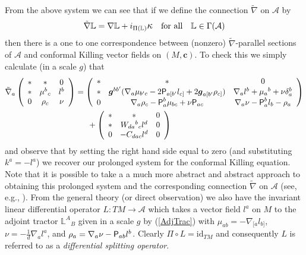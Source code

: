 \documentclass[a4paper,12pt]{amsart}
\newcommand{\kappal}{\mbox{\large{$\kappa$}}}
\newcommand{\V}{\mbox{\sf P}}
\newcommand{\cc}{\boldsymbol{c}}
\def\bg{\mbox{\boldmath $g$}}
\theoremstyle{remark}
\newcommand{\nn}[1]{(\ref{#1})}
\begin{document}
From the above system we can see that if we define the connection $\tilde{\nabla}$ on $\mathcal{A}$ by
\begin{equation}
\tilde{\nabla}\mathbb{L} = \nabla \mathbb{L} + i_{\Pi (\mathbb{L})}\kappal \quad \mbox{for all} \quad \mathbb{L}\in \Gamma(\mathcal{A})
\end{equation}
then there is a one to one correspondence between (nonzero) $\tilde{\nabla}$-parallel sections of $\mathcal{A}$ and conformal Killing vector fields on $(M,\cc)$. To check this we simply calculate (in a scale $g$) that
\begin{align*}
\tilde{\nabla}_a 
\left(\begin{array}{ccc} * & * & 0 \\
* & \mu^b{_c} & l^b \\ 
0 & \rho_c & \nu \\
\end{array}\right)
 &=
\left(\begin{array}{ccc} * & * & 0 \\
* & \bg^{bb'}(\nabla_a\mu_{b'c} - 2\V_{a[b'}l_{c]} + 2\bg_{a[b'}\rho_{c]}) & \nabla_a l^b + \mu_a{^b} + \nu \delta_a^b \\ 
0 & \nabla_a\rho_c - \V_a^b\mu_{bc} +\nu \V_{ac} & \nabla_a\nu -\V_a^b l_b -\rho_a\\
\end{array}\right) \\
& \quad \; \; +
\left(\begin{array}{ccc} * & * & 0 \\
* & W_{da}{^b}_c l^d & 0 \\ 
0 & -C_{dac}l^d & 0 \\
\end{array}\right)
\end{align*}
and observe that by setting the right hand side equal to zero (and substituting $k^a=-l^a$) we recover our prolonged system for the conformal Killing equation. Note that it is possible to take a a much more abstract and abstract approach to obtaining this prolonged system and the corresponding connection $\tilde{\nabla}$ on $\mathcal{A}$ (see, e.g., \cite{CapInfAut,CSbook}). From the general theory (or direct observation) we also have the invariant linear differential operator $L: TM\rightarrow \mathcal{A}$ which takes a vector field $l^a$ on $M$ to the adjoint tractor $\mathbb{L}^A{_B}$ given in a scale $g$ by \nn{AdjTrac} with $\mu_{ab}=-\nabla_{[a}l_{b]}$, $\nu=-\frac{1}{d}\nabla_a l^a$, and $\rho_a = \nabla_a \nu - \V_{ab}l^b$. Clearly $\Pi\circ L =\mathrm{id}_{TM}$ and consequently $L$ is referred to as a \emph{differential splitting operator}.
\end{document}
